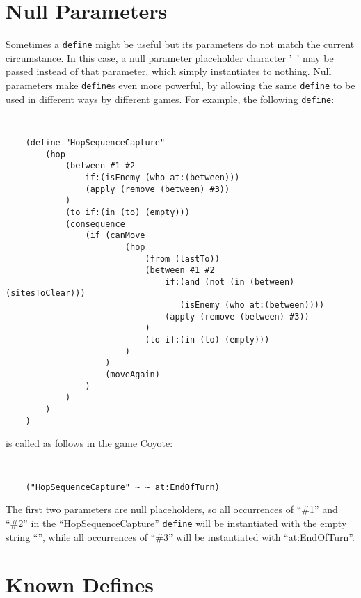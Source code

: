
\section{Null Parameters}

Sometimes a {\tt define} might be useful but its parameters do not match the current circumstance. 
In this case, a null parameter placeholder character '~' may be passed instead of that parameter, which simply instantiates to nothing.
Null parameters make {\tt define}s even more powerful, by allowing the same {\tt define} to be used in different ways by different games.
For example, the following {\tt define}:

{\tt
\begin{verbatim}
    (define "HopSequenceCapture" 
        (hop
            (between #1 #2 
                if:(isEnemy (who at:(between))) 
                (apply (remove (between) #3))
            )
            (to if:(in (to) (empty)))
            (consequence 
                (if (canMove 
                        (hop 
                            (from (lastTo)) 
                            (between #1 #2
                                if:(and (not (in (between) (sitesToClear))) 
                                   (isEnemy (who at:(between))))
                                (apply (remove (between) #3))
                            )
                            (to if:(in (to) (empty)))
                        )
                    ) 
                    (moveAgain)
                )
            )   
        )  
    )  
\end{verbatim}
}

\noindent
is called as follows in the game Coyote:
 
{\tt
\begin{verbatim}
    ("HopSequenceCapture" ~ ~ at:EndOfTurn) 
\end{verbatim}
}

The first two parameters are null placeholders, so all occurrences of ``\#1'' and ``\#2'' in the ``HopSequenceCapture'' {\tt define} will be instantiated with the empty string ``'', while all occurrences of ``\#3'' will be instantiated with ``at:EndOfTurn''.


\section{Known Defines}

